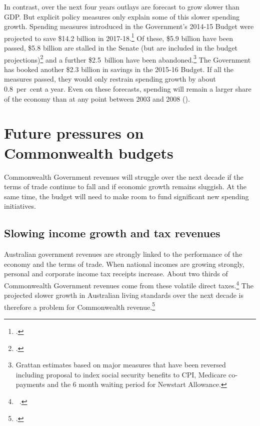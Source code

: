 \documentclass[twoside,english]{palatinob5ona4portrait}
\begin{document}
In contrast, over the next four years outlays are forecast to grow slower than GDP\@. But explicit policy measures only explain some of this slower spending growth. Spending measures introduced in the Government’s 2014-15 Budget were projected to save \$14.2 billion in 2017-18.\footcite[][BP~No.~2, p~47]{Treasury2015BudgetPapers201516}  Of these, \$5.9 billion have been passed, \$5.8 billion are stalled in the Senate (but are included in the budget projections)\footcite{PBO2015f}  and a further \$2.5~billion have been abandoned.\footnote{Grattan estimates based on major measures that have been reversed including proposal to index social security benefits to CPI, Medicare co-payments and the 6 month waiting period for Newstart Allowance.}  The Government has booked another \$2.3 billion in savings in the 2015-16 Budget. If all the measures passed, they would only restrain spending growth by about 0.8~per~cent a year.  Even on these forecasts, spending will remain a larger share of the economy than at any point between 2003 and 2008 ().

\cleardoubleevenstandardpage
{}
\FloatBarrier
\afterpage{\cleardoublepage}


\chapter{Future pressures on Commonwealth budgets}\label{chapter:FISCAL-3}
Commonwealth Government revenues will struggle over the next decade if the terms of trade continue to fall and if economic growth remains sluggish. At the same time, the budget will need to make room to fund significant new spending initiatives. 

\section{Slowing income growth and tax revenues}\label{sec:FISCAL-3-1}
Australian government revenues are strongly linked to the performance of the economy and the terms of trade. When national incomes are growing strongly, personal and corporate income tax receipts increase. About two thirds of Commonwealth Government revenues come from these volatile direct taxes.\footnote{\gao\ \textcite[][BP~No.~1, p.~5-18]{Treasury2014-Budget-Papers-2014-15}.}  The projected slower growth in Australian living standards over the next decade is therefore a problem for Commonwealth revenue.\footcite[][vii]{HenryTaxReview2010}
\end{document}
